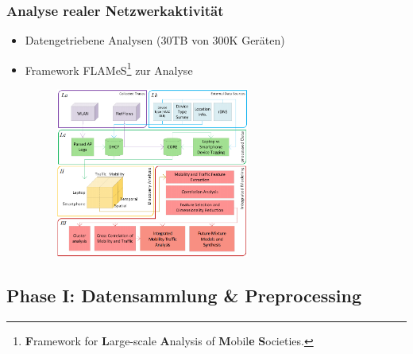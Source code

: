 \documentclass{beamer}
\begin{document}
\begin{frame}
\frametitle{Analyse realer Netzwerkaktivität}
\begin{itemize}
  \item Datengetriebene Analysen ($30$\textsc{TB} von $300$\textsc{K} Geräten)
  \item Framework FLAMeS\footnote{\textbf{F}ramework for \textbf{L}arge-scale \textbf{A}nalysis of 
  \textbf{M}obil\textbf{e} \textbf{S}ocieties.} zur Analyse
  \begin{figure}
    \centering
    \includegraphics[width=0.6\textwidth]{images/FLAMeS.png}\newline  
  \end{figure}  
\end{itemize}
\end{frame}

\subsection{\textbf{Phase I}: Datensammlung \& Preprocessing}
\end{document}
